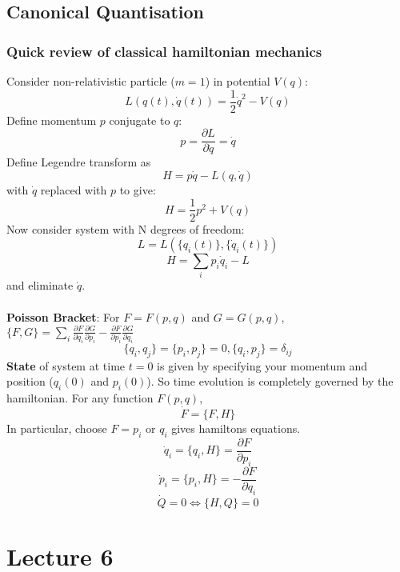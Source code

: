 \documentclass[12pt, a4paper, twoside, titlepage]{article}
\begin{document}
\subsection{Canonical Quantisation}
\subsubsection{Quick review of classical hamiltonian mechanics}
Consider non-relativistic particle ($m=1$) in potential $V(q)$:
$$
L(q(t),\dot q(t) ) = \frac{1}{2} \dot q^2 - V(q)
$$
Define momentum $p$ conjugate to $q$:
$$
p = \frac{\partial L}{\partial \dot q} = \dot q
$$
Define Legendre transform as
$$
H = p\dot q - L(q, \dot q)
$$
with $\dot q$ replaced with $p$ to give:
$$
H = \frac{1}{2} p^2 + V(q)
$$
Now consider system with N degrees of freedom:
$$
L = L(\{q_i(t)\}, \{\dot q_i(t)\})
$$
$$
H = \sum_{i} p_i\dot q_i - L
$$
and eliminate $\dot q$.\\\\
\textbf{Poisson Bracket}:  For $F = F(p,q)$ and $G = G(p,q)$, $\{F,G\} =  \sum_i \frac{\partial F}{\partial q_i}\frac{\partial G}{\partial p_i} - \frac{\partial F}{\partial p_i}\frac{\partial G}{\partial q_i}$
$$
\{q_i,q_j\} = \{p_i, p_j\} = 0, \{q_i, p_j\} = \delta_{ij}
$$
\textbf{State} of system at time $t=0$ is given by specifying your momentum and position ($q_i(0)$ and $p_i(0)$). So time evolution is completely governed by the hamiltonian. For any function $F(p,q)$, $$\dot F = \{F,H\}$$
In particular, choose $F=p_i$ or $q_i$ gives hamiltons equations. $$\dot q_i = \{q_i, H\} = \frac{\partial F}{\partial p_i}$$$$\dot p_i = \{p_i, H\} = -\frac{\partial F}{\partial q_i}$$
$$
\dot Q = 0 \iff \{H,Q\} = 0
$$
\section{Lecture 6}
\end{document}
